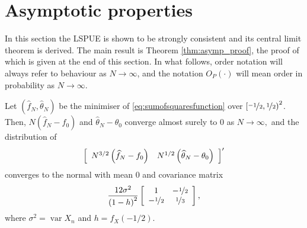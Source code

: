 \section{Asymptotic properties} \label{sec:asymptotic_properties}

In this section the LSPUE is shown to be strongly consistent and its central
limit theorem is derived.  The main result is Theorem \ref{thm:asymp_proof},
the proof of which is given at the end of this section.  In what follows, order
notation will always refer to behaviour as $N \rightarrow \infty$, and the
notation $O_P \left( \cdot \right)$ will mean order in probability as $N
\rightarrow \infty$.

\begin{theorem} \label{thm:asymp_proof} Let $\left(
    \widehat{f}_{N},\widehat{\theta}_{N}\right) $ be the minimiser of
  \eqref{eq:sumofsquaresfunction} over $\left[
    \nicefrac{-1}{2},\nicefrac{1}{2}\right)^2$. Then, $N\left(\widehat{f}_{N}-f_{0}\right)$ and $\widehat{\theta}_{N}-\theta_{0}$ converge almost surely to $0$ as $N\rightarrow\infty,$ and the distribution of
\[
\left[
\begin{array}
[c]{cc}%
N^{3/2}\left(  \widehat{f}_{N}-f_{0}\right)  & N^{1/2}\left( \widehat{\theta}_{N}-\theta_{0} \right)%
\end{array}
\right]  ^{\prime}%
\]
converges to the normal with mean $0$ and covariance matrix%
\[
\frac{12\sigma^{2}}{\left(  1-h\right)  ^{2}}\left[
\begin{array}
[c]{cc}%
1 & -\nicefrac{1}{2}\\
-\nicefrac{1}{2} & \nicefrac{1}{3}
\end{array}
\right]  ,
\]
where $\sigma^{2}=\operatorname{var}X_{n}$ and $h=f_X \left(-1/2\right)$.
\end{theorem}

